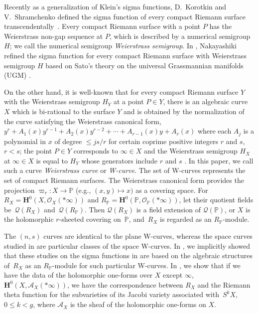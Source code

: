 \documentclass[pdftex]{sigma}
\def\PP{{\mathbb P}}
\def\bH{{\mathbf F}}
\def\bH{{\mathbf H}}
\def\cA{{\mathcal A}}
\def\cO{{\mathcal O}}
\def\cQ{{\mathcal Q}}
\numberwithin{equation}{section}
\begin{document}
Recently as a generalization of Klein's sigma functions, D.~Korotkin and V.~Shramchenko defined the sigma function of every compact Riemann surface transcendentally~\cite{KorotkinS}.
Every compact Riemann surface with a point $P$ has the Weierstrass non-gap sequence at $P$, which is described by a numerical semigroup $H$; we call the numerical semigroup \emph{Weierstrass semigroup}.
In \cite{Nak16}, Nakayashiki refined the sigma function for every compact Riemann surface with Weierstrass semigroup $H$ based on Sato's theory on the universal Grassmannian manifolds (UGM) \cite{SatoN84,SegalWilson}.

On the other hand,
it is well-known that for every compact Riemann surface $Y$ with the Weierstrass semigroup $H_Y$ at a point $P\in Y$,
there is an algebraic curve $X$ which is bi-rational to the surface $Y$ and is obtained by the normalization of the curve satisfying the Weierstrass canonical form, $y^r + A_{1}(x) y^{r-1} + A_{2}(x) y^{r-2} +\cdots + A_{r-1}(x) y + A_{r}(x)$ where each $A_j$ is a polynomial in $x$ of degree $\leq j s/r$ for certain coprime positive integers $r$ and $s$, $r<s$; the point $P\in Y$ corresponds to $\infty \in X$ and the Weierstrass semigroup $H_X$ at $\infty \in X$ is equal to $H_Y$ whose generators include $r$ and $s$
\cite{Baker97, CoppensKato, Kato80, Wei67}.
In this paper, we call such a curve \emph{Weierstrass curve} or \emph{W-curve}. The set of W-curves represents the set of compact Riemann surfaces.
The Weierstrass canonical form
 provides the projection $\varpi_r\colon X \to \PP$ (e.g., $(x,y) \mapsto x)$ as a covering space.
For $R_X = \bH^0(X, \cO_X(*\infty))$ and $R_\PP = \bH^0(\PP, \cO_\PP(*\infty))$, let their quotient fields be~$\cQ(R_X)$ and~$\cQ(R_\PP)$.
Then $\cQ(R_X)$ is a field extension of $\cQ(\PP)$, or $X$ is the holomorphic $r$-sheeted covering on~$\PP$, and~$R_X$ is regarded as an $R_\PP$-module.

The $(n,s)$ curves are identical to the plane W-curves, whereas the space curves studied in \cite{ KMP13, KMP19, MK13} are particular classes of the space W-curves.
In \cite{KMP19}, we implicitly showed that these studies on the sigma functions in \cite{BEL20,KMP13, MP08, MP14, Onishi18} are based on the algebraic structures of~$R_X$ as an $R_\PP$-module for such particular W-curves.
In \cite{KM2020}, we show that if we have the data of the holomorphic one-forms over $X$ except $\infty$, $\bH^0(X, \cA_X(*\infty))$,
we have the correspondence between $R_X$ and the Riemann theta function for the subvarieties of its Jacobi variety associated with~$S^k X$, $0\le k <g$, where $\cA_X$ is the sheaf of the holomorphic one-forms on $X$.
\end{document}
